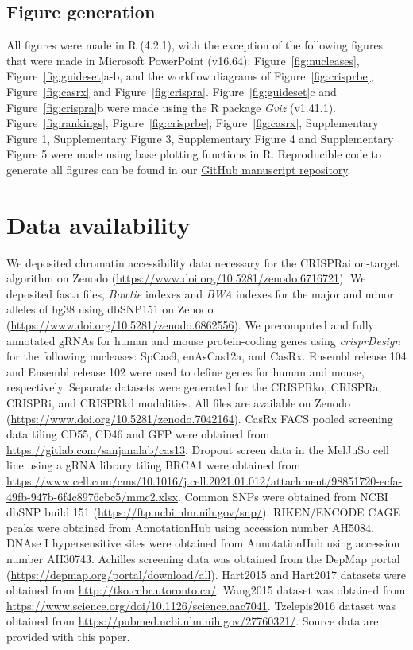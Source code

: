 \documentclass[pdftex,english,10pt]{article}
\begin{document}
{%

\subsection*{Figure generation}

All figures were made in R (4.2.1), with the exception of the following figures that were made in Microsoft PowerPoint (v16.64): Figure~\ref{fig:nucleases}, Figure~\ref{fig:guideset}a-b, and the workflow diagrams of Figure~\ref{fig:crisprbe}, Figure~\ref{fig:casrx} and Figure~\ref{fig:crispra}.  Figure~\ref{fig:guideset}c and Figure~\ref{fig:crispra}b were made using the R package \textit{Gviz} (v1.41.1). Figure~\ref{fig:rankings}, Figure~\ref{fig:crisprbe}, Figure~\ref{fig:casrx}, Supplementary Figure 1, Supplementary Figure 3, Supplementary Figure 4 and Supplementary Figure 5 were made using base plotting functions in R. Reproducible code to generate all figures can be found in our \href{https://github.com/crisprVerse/crisprVersePaper}{GitHub manuscript repository}. 



\section*{Data availability}


We deposited chromatin accessibility data necessary for the CRISPRai on-target algorithm on Zenodo (\url{https://www.doi.org/10.5281/zenodo.6716721}).
We deposited fasta files, \textit{Bowtie} indexes and \textit{BWA} indexes for the major and minor alleles of hg38 using dbSNP151 on Zenodo (\url{https://www.doi.org/10.5281/zenodo.6862556}). We precomputed and fully annotated gRNAs for human and mouse protein-coding genes using \textit{crisprDesign} for the following nucleases: SpCas9, enAsCas12a, and CasRx. Ensembl release 104 and Ensembl release 102 were used to define genes for human and mouse, respectively. Separate datasets were generated for the CRISPRko, CRISPRa, CRISPRi, and CRISPRkd modalities. All files are available on Zenodo (\url{https://www.doi.org/10.5281/zenodo.7042164}).  CasRx FACS pooled screening data tiling CD55, CD46 and GFP were obtained from \url{https://gitlab.com/sanjanalab/cas13}. 
Dropout screen data in the MelJuSo cell line using a gRNA library tiling BRCA1 were obtained from \url{https://www.cell.com/cms/10.1016/j.cell.2021.01.012/attachment/98851720-ecfa-49fb-947b-6f4c8976cbc5/mmc2.xlsx}. Common SNPs were obtained from NCBI dbSNP build 151 (\url{https://ftp.ncbi.nlm.nih.gov/snp/}).
RIKEN/ENCODE CAGE peaks were obtained from AnnotationHub using accession number AH5084.
DNAse I hypersensitive sites were obtained from AnnotationHub using accession number AH30743. 
Achilles screening data was obtained from the DepMap portal (\url{https://depmap.org/portal/download/all}).
Hart2015 and Hart2017 datasets were obtained from \url{http://tko.ccbr.utoronto.ca/}.
Wang2015 dataset was obtained from \url{https://www.science.org/doi/10.1126/science.aac7041}.
Tzelepis2016 dataset was obtained from \url{https://pubmed.ncbi.nlm.nih.gov/27760321/}. Source data are provided with this paper.




}
\end{document}
